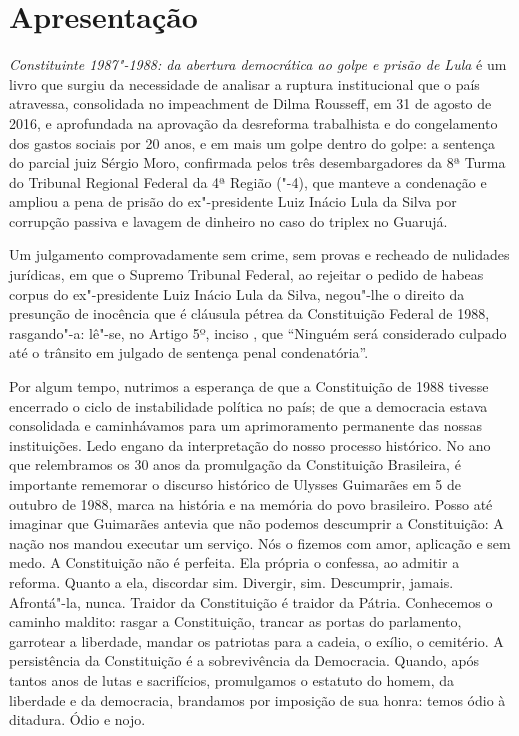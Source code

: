 \chapter{Apresentação}%

\emph{Constituinte 1987"-1988: da abertura democrática ao golpe e prisão de Lula} é um livro
que surgiu da necessidade de analisar a ruptura institucional que o país
atravessa, consolidada no impeachment de Dilma Rousseff, em 31 de agosto de
2016, e aprofundada na aprovação da desreforma
trabalhista e do congelamento dos gastos sociais por 20
anos, e em mais um golpe dentro do golpe: a sentença do parcial juiz Sérgio
Moro, confirmada pelos três desembargadores da 8ª Turma do Tribunal Regional Federal da
4ª Região ("-4), que manteve a condenação e ampliou
a pena de prisão do ex"-presidente Luiz Inácio Lula da Silva por corrupção passiva e lavagem
de dinheiro no caso do triplex no Guarujá.

Um julgamento comprovadamente sem crime, sem provas e recheado de nulidades jurídicas, em que
o Supremo Tribunal Federal, ao rejeitar o pedido de habeas corpus do ex"-presidente Luiz Inácio
Lula da Silva, negou"-lhe o direito da presunção de inocência que é cláusula
pétrea da Constituição Federal de 1988, rasgando"-a: lê"-se, no Artigo 5º, inciso
, que ``Ninguém será considerado culpado até o trânsito em julgado de sentença
penal condenatória''.

Por algum tempo, nutrimos a esperança de que a Constituição de 1988 tivesse encerrado
o ciclo de instabilidade política no país; de que a democracia
estava consolidada e caminhávamos para um aprimoramento
permanente das nossas instituições. Ledo engano da interpretação do
nosso processo histórico.
No ano que relembramos os 30 anos da promulgação da Constituição Brasileira,
é importante rememorar o discurso histórico de Ulysses Guimarães em 5 de
outubro de 1988, marca na história e na memória do povo brasileiro. Posso
até imaginar que Guimarães antevia que não podemos descumprir a Constituição:
A nação nos mandou executar um serviço. Nós o fizemos com amor, aplicação e sem medo. A
Constituição não é perfeita. Ela própria o confessa, ao admitir a reforma. Quanto a ela,
discordar sim. Divergir, sim. Descumprir, jamais. Afrontá"-la, nunca. Traidor da Constituição
é traidor da Pátria. Conhecemos o caminho maldito: rasgar a Constituição, trancar as portas
do parlamento, garrotear a liberdade, mandar os patriotas para a cadeia, o exílio, o cemitério.
A persistência da Constituição é a sobrevivência da Democracia. Quando, após tantos anos de
lutas e sacrifícios, promulgamos o estatuto do homem, da liberdade e da democracia, brandamos
por imposição de sua honra: temos ódio à ditadura. Ódio e nojo.

